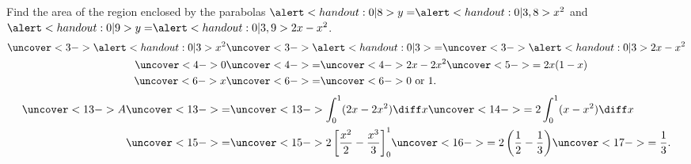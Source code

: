 \begin{frame}
\begin{example}
\begin{columns}
Find the area of the region enclosed by the parabolas $\alert<handout:0| 8>{y =} \alert<handout:0| 3,8>{x^2}$ and $\alert<handout:0| 9>{y =} \alert<handout:0| 3,9>{2x - x^2}$.
\abovedisplayskip=0pt
\belowdisplayskip=0pt
\abovedisplayshortskip=0pt
\belowdisplayshortskip=0pt
\begin{align*}
\uncover<3->{\alert<handout:0| 3>{x^2}} & \uncover<3->{\alert<handout:0| 3>{=}}  \uncover<3->{\alert<handout:0| 3>{2x - x^2}} \\
\uncover<4->{0} & \uncover<4->{=}  \uncover<4->{2x - 2x^2} \uncover<5->{ = 2x(1 - x)} \\
\uncover<6->{x} & \uncover<6->{=}  \uncover<6->{0 \text{ or } 1.}
\end{align*}
\begin{align*}
\uncover<13->{A} & \uncover<13->{=}  \uncover<13->{\int_0^1 (2x - 2x^2) \diff x} \uncover<14->{ = 2\int_0^1 (x - x^2) \diff x} \\
 & \uncover<15->{=}  \uncover<15->{2\left[ \frac{x^2}{2} - \frac{x^3}{3}\right]_0^1} \uncover<16->{ = 2\left( \frac{1}{2} - \frac{1}{3}\right)} \uncover<17->{ = \frac{1}{3}.}
\end{align*}
\end{columns}
\end{example}
\end{frame}
